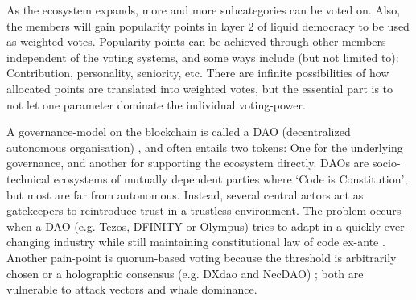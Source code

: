 \documentclass[12pt]{article}
\begin{document}

As the ecosystem expands, more and more subcategories can be voted on. Also, the members will gain popularity points in layer 2 of liquid democracy to be used as weighted votes. Popularity points can be achieved through other members independent of the voting systems, and some ways include (but not limited to): Contribution, personality, seniority, etc. There are infinite possibilities of how allocated points are translated into weighted votes, but the essential part is to not let one parameter dominate the individual voting-power. 

A governance-model on the blockchain is called a DAO (decentralized autonomous organisation) \cite{dao}, and often entails two tokens: One for the underlying governance, and another for supporting the ecosystem directly. DAOs are socio-technical ecosystems of mutually dependent parties where ‘Code is Constitution’, but most are far from autonomous. Instead, several central actors act as gatekeepers to reintroduce trust in a trustless environment. The problem occurs when a DAO (e.g. Tezos, DFINITY or Olympus) tries to adapt in a quickly ever-changing industry while still maintaining constitutional law of code ex-ante \cite{tezos}. Another pain-point is quorum-based voting because the threshold is arbitrarily chosen or a holographic consensus (e.g. DXdao and NecDAO) \cite{holo}; both are vulnerable to attack vectors and whale dominance.
\end{document}
